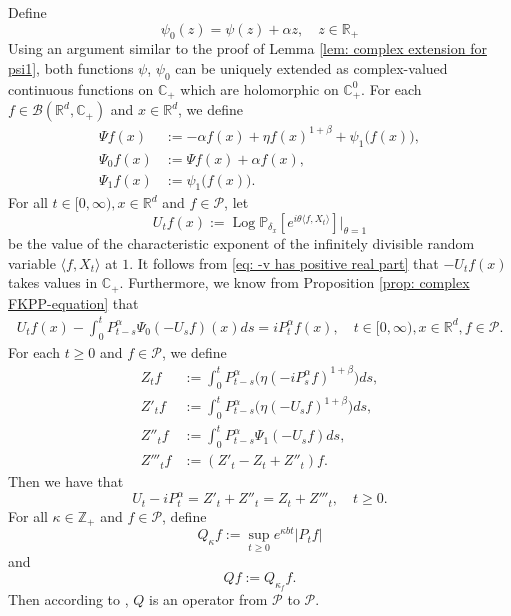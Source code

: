\documentclass[12pt,a4paper]{amsart}
\theoremstyle{plain}
\theoremstyle{definition}
\numberwithin{equation}{section}
\begin{document}
     Define 
\begin{equation}
\label{eq: psi 0}
    \psi_0(z)=\psi(z)+\alpha z,\quad z\in \mathbb{R}_+
\end{equation}
  Using an argument similar to the proof  of Lemma \ref{lem: complex extension for psi1},
    both functions $\psi$, $\psi_0$ can be uniquely extended as complex-valued continuous functions on $\mathbb C_+$ which are holomorphic on $\mathbb C^0_+$.
    For each $f\in \mathcal B(\mathbb R^d, \mathbb C_+)$ and $x\in \mathbb R^d$, we define
\begin{align}
\label{eq: def of operator Psi}
    \Psi f (x) &:= -\alpha f(x) + \eta f(x)^{1+\beta} + \psi_1\big(f(x)\big),
    \\\Psi_0 f(x) &:= \Psi f(x) + \alpha f(x),
    \\ \Psi_1 f(x) &:= \psi_1 \big(f(x)\big).
\end{align}
    For all $t\in [0,\infty), x\in \mathbb R^d $ and $f \in \mathcal{P}$, let 
\begin{equation}\label{eq: def of U_t}
    U_tf(x) := \operatorname{Log} \mathbb P_{\delta_x}[e^{i\theta \langle f, X_t\rangle}]|_{\theta = 1}
\end{equation} 
    be the value of the characteristic exponent of the infinitely divisible random variable $\langle f, X_t\rangle$ at $1$.
    It follows from \eqref{eq: -v has positive real part} that $-U_tf(x)$ takes values in $\mathbb C_+$. Furthermore, we know from Proposition \ref{prop: complex FKPP-equation} that
\begin{align}
\label{eq:chareq2}
    U_tf(x)-\int_0^t P^\alpha_{t-s} \Psi_0(-U_sf)(x)ds
    =i P^{\alpha}_t f(x),
    \quad t\in [0,\infty), x\in \mathbb{R}^d, f\in \mathcal P.
\end{align}
       For each $t\geq 0$ and $f\in \mathcal P$, we define
\begin{align}
\label{eq: def of Zf}
    Z_t f
    &:= \int_0^t P^\alpha_{t-s}\big( \eta (-i P^\alpha_sf)^{1+\beta}\big)ds,
    \\ Z'_t f
    &:= \int_0^t P^\alpha_{t-s}\big( \eta (-U_s f)^{1+\beta}\big)ds,
    \\ Z''_t f
    &:= \int_0^t P^\alpha_{t-s}\Psi_1(-U_s f)ds,
    \\ Z'''_t f
    &:= (Z'_t - Z_t+ Z''_t)f.
\end{align}
    Then we have that
\begin{equation}
\label{eq: key equality}
    U_t - i P^\alpha_t
    = Z'_t + Z''_t
    = Z_t+Z'''_t, \quad t\geq 0.
\end{equation}
	For all $\kappa \in \mathbb Z_+$ and $f\in \mathcal P$, define
\begin{equation}\label{Q_k}
    Q_\kappa f
    := \sup_{t\geq 0} e^{\kappa b t}|P_t f|
\end{equation}
    and
\begin{equation}\label{Q}
    Q f:= Q_{\kappa_f}f.
\end{equation}
    Then according to \cite[Fact 1.2]{MarksMilos2018CLT}, $Q$ is an operator from $\mathcal P$ to $\mathcal P$.
\end{document}

